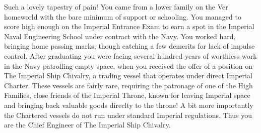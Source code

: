 \documentclass[char]{guildcamp4}
\begin{document}
\name{\cVtwo{}}


Such a lovely tapestry of pain! 
You came from a lower family on the Ver homeworld with the bare minimum of support or schooling. You managed to score high enough
on the Imperial Entrance Exam to earn a spot in the Imperial Naval Engineering School under contract with the Navy. You worked
hard, bringing home passing marks, though catching a few demerits for lack of impulse control. After graduating you were facing 
several hundred years of worthless work in the Navy patrolling empty space, when you received the offer of a position on 
The Imperial Ship Chivalry, a trading vessel that operates under direct Imperial Charter. These vessels are fairly rare, requiring
the patronage of one of the High Families, close friends of the Imperial Throne, known for leaving Imperial space and bringing
back valuable goods direclty to the throne! A bit more importantly the Chartered vessels do not run under standard Imperial regulations.
Thus you are the Chief Engineer of The Imperial Ship Chivalry. 



\begin{itemz}[Goals]
	\item 
\end{itemz}

\begin{itemz}[Notes]
	\item 
\end{itemz}

\begin{contacts}
\end{contacts}
\end{document}
